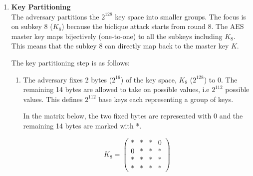 \documentclass{report}
\begin{document}
 \begin{enumerate}[start = 1, label={(\bfseries Step\arabic*):}]
    \item \textbf{Key Partitioning} \\ The adversary partitions the $2^{128}$ key space into smaller groups. The focus is on subkey 8 ($K_8$) because the biclique attack starts from round 8. The AES master key maps bijectively (one-to-one) to all the subkeys including $K_8$. This means that the subkey 8 can directly map back to the master key $K$.

    The key partitioning step is as follows:
    
    \begin{enumerate}
        \item The adversary fixes 2 bytes ($2^{16}$) of the key space, $K_8$ ($2^{128}$) to 0. The remaining 14 bytes are allowed to take on possible values, i.e $2^{112}$ possible values. This defines $2^{112}$ base keys each representing a group of keys.
    
        In the matrix below, the two fixed bytes are represented with 0 and the remaining 14 bytes are marked with *.
    
        \[
        K_8 = \begin{pmatrix}
        * & * & * & 0 \\
        0 & * & * & * \\
        * & * & * & * \\
        * & * & * & *
        \end{pmatrix}
        \]
    

\end{enumerate}
\end{enumerate}
\end{document}
